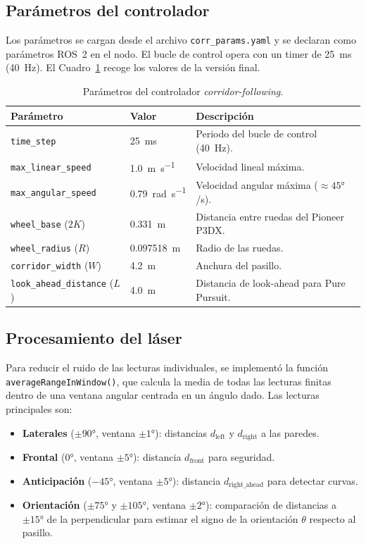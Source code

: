 \documentclass[12pt]{article}
\begin{document}
\subsection{Parámetros del controlador}
Los parámetros se cargan desde el archivo \texttt{corr\_params.yaml} y se declaran como parámetros ROS~2 en el nodo. El bucle de control opera con un timer de \SI{25}{\milli\second} (40~Hz). El Cuadro~\ref{tab:parametros} recoge los valores de la versión final.

\begin{table}[H]
  \centering
  \caption{Parámetros del controlador \emph{corridor-following}.}
  \label{tab:parametros}
  \begin{tabularx}{0.98\linewidth}{l l X}
    \toprule
    \textbf{Parámetro} & \textbf{Valor} & \textbf{Descripción} \\
    \midrule
    \texttt{time\_step} & \SI{25}{\milli\second} & Periodo del bucle de control (40~Hz). \\
    \texttt{max\_linear\_speed} & \SI{1.0}{\meter\per\second} & Velocidad lineal máxima. \\
    \texttt{max\_angular\_speed} & \SI{0.79}{\radian\per\second} & Velocidad angular máxima ($\approx 45°$/s). \\
    \texttt{wheel\_base} ($2K$) & \SI{0.331}{\meter} & Distancia entre ruedas del Pioneer P3DX. \\
    \texttt{wheel\_radius} ($R$) & \SI{0.097518}{\meter} & Radio de las ruedas. \\
    \texttt{corridor\_width} ($W$) & \SI{4.2}{\meter} & Anchura del pasillo. \\
    \texttt{look\_ahead\_distance} ($L$) & \SI{4.0}{\meter} & Distancia de look-ahead para Pure Pursuit. \\
    \bottomrule
  \end{tabularx}
\end{table}

\subsection{Procesamiento del láser}
Para reducir el ruido de las lecturas individuales, se implementó la función \texttt{averageRangeInWindow()}, que calcula la media de todas las lecturas finitas dentro de una ventana angular centrada en un ángulo dado. Las lecturas principales son:

\begin{itemize}[leftmargin=2em]
  \item \textbf{Laterales} ($\pm 90°$, ventana $\pm 1°$): distancias $d_\text{left}$ y $d_\text{right}$ a las paredes.
  \item \textbf{Frontal} ($0°$, ventana $\pm 5°$): distancia $d_\text{front}$ para seguridad.
  \item \textbf{Anticipación} ($-45°$, ventana $\pm 5°$): distancia $d_\text{right\_ahead}$ para detectar curvas.
  \item \textbf{Orientación} ($\pm 75°$ y $\pm 105°$, ventana $\pm 2°$): comparación de distancias a $\pm 15°$ de la perpendicular para estimar el signo de la orientación $\theta$ respecto al pasillo.
\end{itemize}
\end{document}
